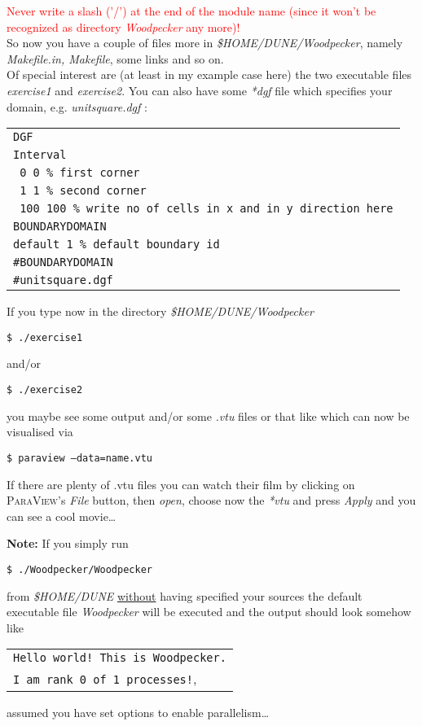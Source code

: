 \documentclass[a4paper,12pt]{article}
\newcommand{\dyeitred}{\textcolor{red}}{}
\begin{document}
\dyeitred{\Stopsign Never write a slash ('/') at the end of the module name (since it
won't be recognized as directory \textit{Woodpecker} any more)!}\\
So now you have a couple of files more in \textit{\$HOME/DUNE/Woodpecker},
namely \textit{Makefile.in, Makefile}, some links and so on. \\
Of special interest are (at least in my example case here) the two
executable files \textit{exercise1} and \textit{exercise2}. You can also have
some \textit{*dgf} file which specifies your domain, e.g. \textit{unitsquare.dgf
}:
\begin{center}
  \begin{tabular}{l}
\texttt{DGF}\\
\texttt{Interval}\\
\texttt{ 0  0         \% first corner}\\ 
\texttt{ 1  1         \% second corner}\\
\texttt{ 100 100      \% write no of cells in x and  in y direction here}\\
\texttt{BOUNDARYDOMAIN}\\
\texttt{default 1     \% default boundary id}\\
\texttt{\#BOUNDARYDOMAIN}\\
\texttt{\#unitsquare.dgf}

\end{tabular}
\end{center}

If you type now in the directory \textit{\$HOME/DUNE/Woodpecker} 
\begin{center}
  \texttt{\$ ./exercise1}
\end{center}
and/or
\begin{center}
  \texttt{\$ ./exercise2}
\end{center}
you maybe see some output and/or some \textit{.vtu} files or that like which
can now be visualised via 
 \begin{center}
  \texttt{\$ paraview --data=name.vtu}
\end{center}
If there are plenty of .vtu files you can watch their film by clicking on
\textsc{ParaView}'s \textit{File} button, then \textit{open}, choose now the
\textit{*vtu} and press \textit{Apply} and you can see a cool movie\ldots

\textbf{Note:} If you simply run \begin{center} \texttt{\$
    ./Woodpecker/Woodpecker} \end{center}from \textit{\$HOME/DUNE}  \underline{without} having specified your
sources the default executable file \textit{Woodpecker} will be executed and the output should
look somehow like 
\begin{center}
\begin{tabular}{l}
  \texttt{Hello world! This is Woodpecker.}\\
  \texttt{I am rank 0 of 1 processes!},
\end{tabular}
 \end{center}
assumed you have set options to enable parallelism\ldots
 
\end{document}
